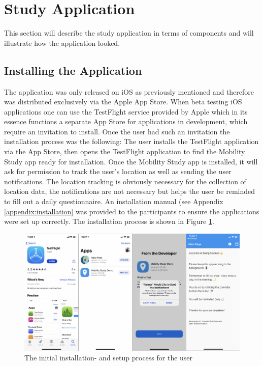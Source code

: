 \section{Study Application}
This section will describe the study application in terms of components and will illustrate how the application looked.

\subsection{Installing the Application}
The application was only released on iOS as previously mentioned and therefore was distributed exclusively via the Apple App Store. When beta testing iOS applications one can use the TestFlight service provided by Apple which in its essence functions a separate App Store for applications in development, which require an invitation to install. Once the user had such an invitation the installation process was the following: The user installs the TestFlight application via the App Store, then opens the TestFlight application to find the Mobility Study app ready for installation. Once the Mobility Study app is installed, it will ask for permission to track the user's location as well as sending the user notifications. The location tracking is obviously necessary for the collection of location data, the notifications are not necessary but helps the user be reminded to fill out a daily questionnaire. An installation manual (see Appendix \ref{appendix:installation} was provided to the participants to ensure the applications were set up correctly. The installation process is shown in Figure \ref{fig:screens-install}.

\begin{figure}
    \centering
    \includegraphics[width=\textwidth]{images/app_imgs/screens-install.pdf}
    \caption{The initial installation- and setup process for the user}
    \label{fig:screens-install}
\end{figure}

